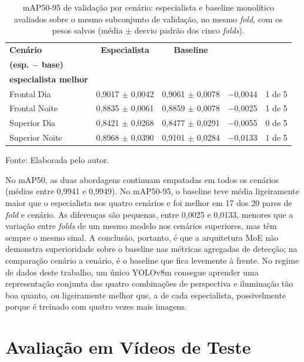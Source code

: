 \begin{table}[htb]
\centering
\caption{mAP50-95 de validação por cenário: especialista e baseline monolítico avaliados sobre o mesmo subconjunto de validação, no mesmo \textit{fold}, com os pesos salvos (média $\pm$ desvio padrão dos cinco \textit{folds}).}
\label{tab:res-comparacao-cenario}
\footnotesize
\begin{tabular}{lcccc}
\hline
\textbf{Cenário} & \textbf{Especialista} & \textbf{Baseline} & \shortstack{\textbf{Diferença}\\\textbf{(esp. $-$ base)}} & \shortstack{\textbf{\textit{Folds} com}\\\textbf{especialista melhor}} \\
\hline
Frontal Dia & 0,9017 $\pm$ 0,0042 & 0,9061 $\pm$ 0,0078 & $-$0,0044 & 1 de 5 \\
Frontal Noite & 0,8835 $\pm$ 0,0061 & 0,8859 $\pm$ 0,0078 & $-$0,0025 & 1 de 5 \\
Superior Dia & 0,8421 $\pm$ 0,0268 & 0,8477 $\pm$ 0,0291 & $-$0,0055 & 0 de 5 \\
Superior Noite & 0,8968 $\pm$ 0,0390 & 0,9101 $\pm$ 0,0284 & $-$0,0133 & 1 de 5 \\
\hline
\end{tabular}

\vspace{0.2cm}
\normalsize
Fonte: Elaborada pelo autor.
\end{table}

No mAP50, as duas abordagens continuam empatadas em todos os cenários (médias entre 0,9941 e 0,9949). No mAP50-95, o baseline teve média ligeiramente maior que o especialista nos quatro cenários e foi melhor em 17 dos 20 pares de \textit{fold} e cenário. As diferenças são pequenas, entre 0,0025 e 0,0133, menores que a variação entre \textit{folds} de um mesmo modelo nos cenários superiores, mas têm sempre o mesmo sinal. A conclusão, portanto, é que a arquitetura MoE não demonstra superioridade sobre o baseline nas métricas agregadas de detecção; na comparação cenário a cenário, é o baseline que fica levemente à frente. No regime de dados deste trabalho, um único YOLOv8m consegue aprender uma representação conjunta das quatro combinações de perspectiva e iluminação tão boa quanto, ou ligeiramente melhor que, a de cada especialista, possivelmente porque é treinado com quatro vezes mais imagens.

\section{Avaliação em Vídeos de Teste}
\label{sec:res-videos}

